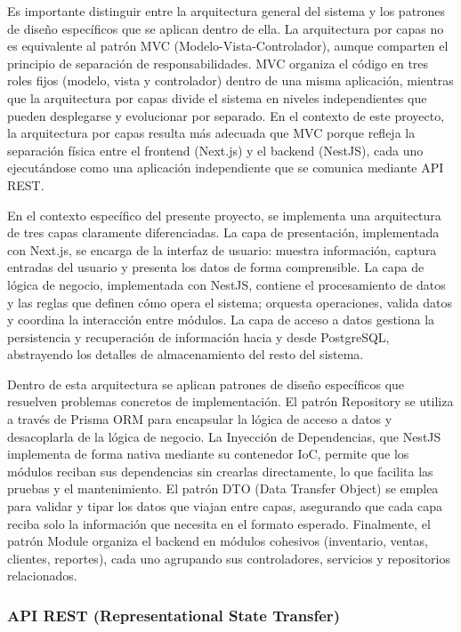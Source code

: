 \documentclass[spanish]{ieee_upb}
\begin{document}
Es importante distinguir entre la arquitectura general del sistema y los patrones de diseño específicos que se aplican dentro de ella. La arquitectura por capas no es equivalente al patrón MVC (Modelo-Vista-Controlador), aunque comparten el principio de separación de responsabilidades. MVC organiza el código en tres roles fijos (modelo, vista y controlador) dentro de una misma aplicación, mientras que la arquitectura por capas divide el sistema en niveles independientes que pueden desplegarse y evolucionar por separado. En el contexto de este proyecto, la arquitectura por capas resulta más adecuada que MVC porque refleja la separación física entre el frontend (Next.js) y el backend (NestJS), cada uno ejecutándose como una aplicación independiente que se comunica mediante API REST.

En el contexto específico del presente proyecto, se implementa una arquitectura de tres capas claramente diferenciadas. La capa de presentación, implementada con Next.js, se encarga de la interfaz de usuario: muestra información, captura entradas del usuario y presenta los datos de forma comprensible. La capa de lógica de negocio, implementada con NestJS, contiene el procesamiento de datos y las reglas que definen cómo opera el sistema; orquesta operaciones, valida datos y coordina la interacción entre módulos. La capa de acceso a datos gestiona la persistencia y recuperación de información hacia y desde PostgreSQL, abstrayendo los detalles de almacenamiento del resto del sistema.

Dentro de esta arquitectura se aplican patrones de diseño específicos que resuelven problemas concretos de implementación. El patrón Repository se utiliza a través de Prisma ORM para encapsular la lógica de acceso a datos y desacoplarla de la lógica de negocio. La Inyección de Dependencias, que NestJS implementa de forma nativa mediante su contenedor IoC, permite que los módulos reciban sus dependencias sin crearlas directamente, lo que facilita las pruebas y el mantenimiento. El patrón DTO (Data Transfer Object) se emplea para validar y tipar los datos que viajan entre capas, asegurando que cada capa reciba solo la información que necesita en el formato esperado. Finalmente, el patrón Module organiza el backend en módulos cohesivos (inventario, ventas, clientes, reportes), cada uno agrupando sus controladores, servicios y repositorios relacionados.

\subsubsection{API REST (Representational State Transfer)}
\end{document}
